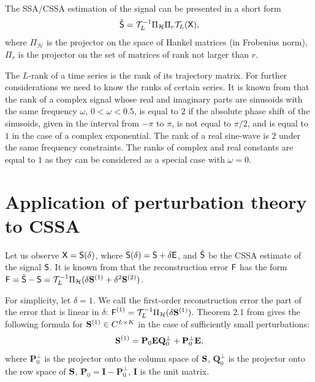 \documentclass[engproc, submit, article,pdftex,moreauthors]{Definitions/mdpi}
\begin{document}
The SSA/CSSA estimation of the signal can be presented in a short form
	\begin{equation*}
		\tilde{\textsf{S}} = \mathcal{T}^{-1}_{L} \Pi_{\mathcal{H}} \Pi_{r} \mathcal{T}_L (\textsf{X}),
	\end{equation*}
where $\Pi_{\mathcal{H}}$ is the projector on the space of Hankel matrices (in Frobenius norm), $\Pi_{r}$ is the projector on the set of matrices of rank not larger than $r$.

The $L$-rank of a time series is the rank of its trajectory matrix. For further considerations we need to know the ranks of certain series.
It is known from \cite{Golyandina.etal2013} that the rank of a complex signal whose real and imaginary parts are sinusoids with the same frequency $\omega$, $0<\omega<0.5$, is equal to $2$ if the absolute phase shift of the sinusoids, given in the interval from $-\pi$ to $\pi$, is not equal to $\pi/2$, and is equal to $1$ in the case of a complex exponential. The rank of a real sine-wave is $2$ under the same frequency constraints. The ranks of complex and real constants are equal to $1$ as they can be considered as a special case with $\omega = 0$.

\section{Application of perturbation theory to CSSA}

Let us observe $\textsf{X} = \textsf{S}(\delta)$, where $\textsf{S}(\delta) = \textsf{S} + \delta \textsf{E}$, and $\tilde{\textsf{S}}$ be the CSSA estimate of the signal $\textsf{S}$.
It is known from \cite{Nekrutkin} that
the reconstruction error $\textsf{F}$ has the form $\textsf{F} = \tilde{\textsf{S}} - \textsf{S} = \mathcal{T}_L^{-1} \Pi_{\mathcal{H}} (\delta\mathbf{S}^{(1)} + \delta^2\mathbf{S}^{(2)})$.

For simplicity, let $\delta = 1$. We call the first-order reconstruction error the part of the error that is linear in $\delta$: $\textsf{F}^{(1)} = \mathcal{T}_L^{-1} \Pi_{\mathcal{H}} (\delta\mathbf{S}^{(1)})$.
Theorem 2.1 from \cite{Nekrutkin} gives the following formula for $\mathbf{S}^{(1)}\in \space
C^{L\times K}$ in the case of sufficiently small perturbations:
\begin{equation} \label{eq:main}
	\mathbf{S}^{(1)} = \mathbf{P}_0 \mathbf{E} \mathbf{Q}^{\perp}_0 + \mathbf{P}^{\perp}_0 \mathbf{E},
\end{equation}
where $\mathbf{P}^{\perp}_0$ is the projector onto the column space of $\mathbf{S}$, $\mathbf{Q}^{\perp}_0$ is the projector onto the row space of $\mathbf{S}$, $\mathbf{P}_0 = \mathbf{I} - \mathbf{P}^{\perp}_0$, $\mathbf{I}$ is the unit matrix.
\end{document}
